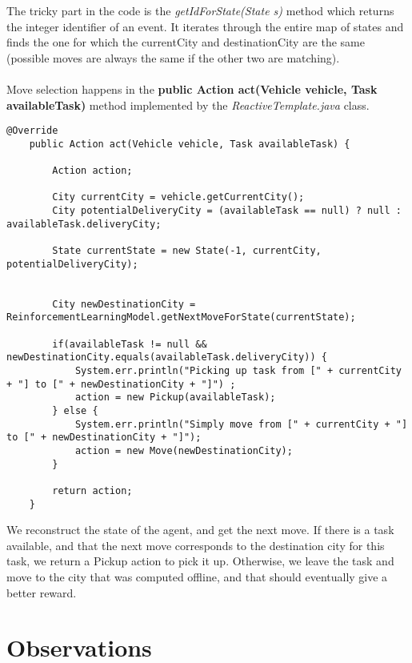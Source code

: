 \documentclass[fontsize=12pt]{scrartcl} %
\begin{document}
The tricky part in the code is the \textit{getIdForState(State s)} method which returns the integer identifier of an event. It iterates through the entire map of states and finds the one for which the currentCity and destinationCity are the same (possible moves are always the same if the other two are matching). \\ \\

Move selection happens in the \textbf{public Action act(Vehicle vehicle, Task availableTask)} method implemented by the \textit{ReactiveTemplate.java} class.

\begin{lstlisting}[breaklines]
	@Override
	public Action act(Vehicle vehicle, Task availableTask) {
		
		Action action;
		
		City currentCity = vehicle.getCurrentCity();
		City potentialDeliveryCity = (availableTask == null) ? null : availableTask.deliveryCity;
		
		State currentState = new State(-1, currentCity, potentialDeliveryCity);
		
		
		City newDestinationCity = ReinforcementLearningModel.getNextMoveForState(currentState);
		
		if(availableTask != null && newDestinationCity.equals(availableTask.deliveryCity)) {
			System.err.println("Picking up task from [" + currentCity + "] to [" + newDestinationCity + "]") ;
			action = new Pickup(availableTask);
		} else {
			System.err.println("Simply move from [" + currentCity + "] to [" + newDestinationCity + "]");
			action = new Move(newDestinationCity);
		}
		
		return action; 
	}
\end{lstlisting}
 
We reconstruct the state of the agent, and get the next move. If there is a task available, and that the next move corresponds to the destination city for this task, we return a Pickup action to pick it up. Otherwise, we leave the task and move to the city that was computed offline, and that should eventually give a better reward.

\section*{Observations}
\end{document}
